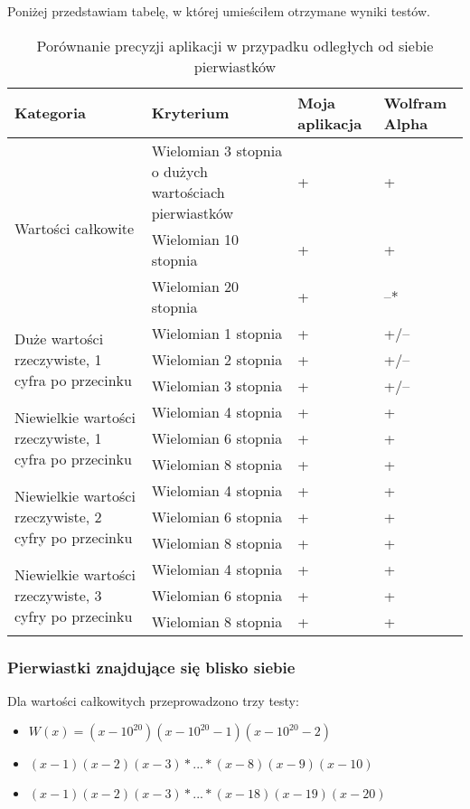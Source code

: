 Poniżej przedstawiam tabelę, w której umieściłem otrzymane wyniki testów.

\begin{table}
	\caption{Porównanie precyzji aplikacji w przypadku odległych od siebie pierwiastków}
	\begin{tabular}{ |p{5cm}|p{5cm}|p{1.5cm}|p{1.5cm}| } 
		\hline
		Kategoria & Kryterium & Moja aplikacja & Wolfram Alpha \\
		\hline
		\multirow{3}{*}{Wartości całkowite}
		& Wielomian 3 stopnia o dużych wartościach pierwiastków & + & + \\
		& Wielomian 10 stopnia & + & + \\
		& Wielomian 20 stopnia & + & --* \\
		\hline
		\multirow{3}{12em}{Duże wartości rzeczywiste, 1 cyfra po przecinku}
		& Wielomian 1 stopnia & + & +/-- \\
		& Wielomian 2 stopnia & + & +/-- \\
		& Wielomian 3 stopnia & + & +/-- \\
		\hline
		\multirow{3}{14em}{Niewielkie wartości rzeczywiste, 1 cyfra po przecinku}
		& Wielomian 4 stopnia & + & + \\
		& Wielomian 6 stopnia & + & + \\
		& Wielomian 8 stopnia & + & + \\
		\hline
		\multirow{3}{14em}{Niewielkie wartości rzeczywiste, 2 cyfry po przecinku}
		& Wielomian 4 stopnia & + & + \\
		& Wielomian 6 stopnia & + & + \\
		& Wielomian 8 stopnia & + & + \\
		\hline
		\multirow{3}{14em}{Niewielkie wartości rzeczywiste, 3 cyfry po przecinku}
		& Wielomian 4 stopnia & + & + \\
		& Wielomian 6 stopnia & + & + \\
		& Wielomian 8 stopnia & + & + \\
		\hline
	\end{tabular}
\end{table}

\subsubsection {Pierwiastki znajdujące się blisko siebie}

Dla wartości całkowitych przeprowadzono trzy testy:
\begin{itemize}
	\item $W(x)=(x-10^{20})(x-10^{20}-1)(x-10^{20}-2)$
	\item $(x-1)(x-2)(x-3)*...*(x-8)(x-9)(x-10)$
	\item $(x-1)(x-2)(x-3)*...*(x-18)(x-19)(x-20)$
\end{itemize}

